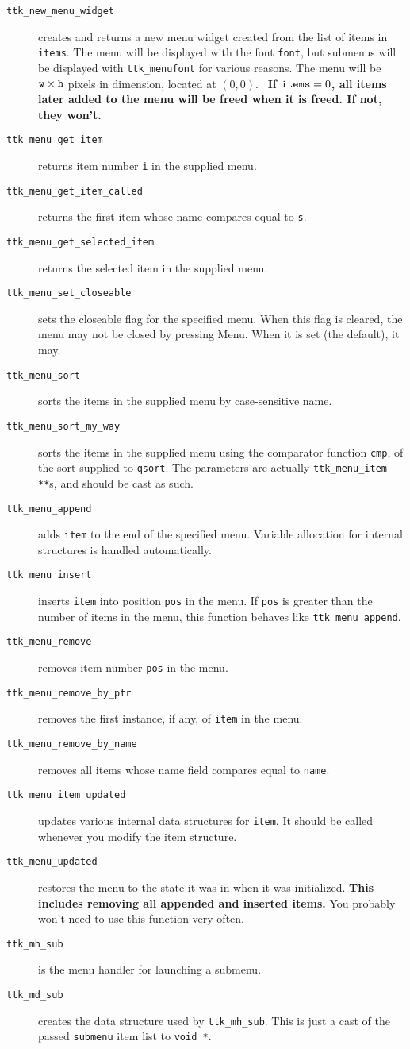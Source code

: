 \documentclass[12pt,letterpaper]{report}
\let\ttt\tt
\def\tt{\def\_{{\ttt\char`\_}}\ttt}
\begin{document}
\begin{description}
\item[{\tt ttk_new_menu_widget}] creates and returns a new menu widget created from the list of items in \verb|items|.
The menu will be displayed with the font \verb|font|, but submenus will be displayed with \verb|ttk_menufont|
for various reasons. The menu will be $\verb|w| \times \verb|h|$ pixels in dimension, located at $(0,0)$. \ {\bf If $\verb|items| = 0$, all items later added to the menu will be freed when it is freed. If not,
they won't.}
\item[{\tt ttk_menu_get_item}] returns item number \verb|i| in the supplied menu.
\item[{\tt ttk_menu_get_item_called}] returns the first item whose name compares equal to \verb|s|.
\item[{\tt ttk_menu_get_selected_item}] returns the selected item in the supplied menu.
\item[{\tt ttk_menu_set_closeable}] sets the {\sf closeable} flag for the specified menu. When this flag
is cleared, the menu may not be closed by pressing Menu. When it is set (the default), it may.
\item[{\tt ttk_menu_sort}] sorts the items in the supplied menu by case-sensitive name.
\item[{\tt ttk_menu_sort_my_way}] sorts the items in the supplied menu using the comparator function \verb|cmp|,
of the sort supplied to \verb|qsort|. The parameters are actually \verb|ttk_menu_item **|s, and should be
cast as such.
\item[{\tt ttk_menu_append}] adds \verb|item| to the end of the specified menu. Variable allocation for internal structures
is handled automatically.
\item[{\tt ttk_menu_insert}] inserts \verb|item| into position \verb|pos| in the menu. If \verb|pos| is 
greater than the number of items in the menu, this function behaves like \verb|ttk_menu_append|.
\item[{\tt ttk_menu_remove}] removes item number \verb|pos| in the menu.
\item[{\tt ttk_menu_remove_by_ptr}] removes the first instance, if any, of \verb|item| in the menu.
\item[{\tt ttk_menu_remove_by_name}] removes all items whose name field compares equal to \verb|name|.
\item[{\tt ttk_menu_item_updated}] updates various internal data structures for \verb|item|.
It should be called whenever you modify the item structure.
\item[{\tt ttk_menu_updated}] restores the menu to the state it was in when it was initialized.
{\bf This includes removing all appended and inserted items.} You probably won't need to use this
function very often.
\item[{\tt ttk_mh_sub}] is the menu handler for launching a submenu.
\item[{\tt ttk_md_sub}] creates the data structure used by {\tt ttk_mh_sub}. This is just a cast of
the passed \verb|submenu| item list to \verb|void *|.
\end{description}
\end{document}
